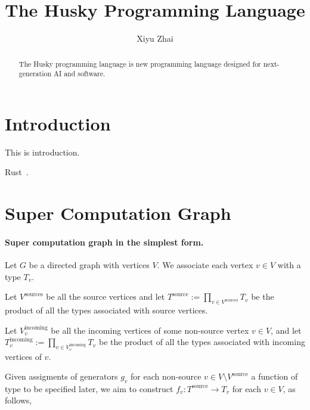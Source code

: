 \documentclass{article}
\title{The Husky Programming Language}
\date{}
\author{Xiyu Zhai}
\begin{document}

\maketitle

\begin{abstract}
	The Husky programming language is new programming language designed for next-generation AI and software.
\end{abstract}





\section{Introduction}
This is introduction.

Rust~\cite{bugden2022rust}.

\section{Super Computation Graph}

\paragraph{Super computation graph in the simplest form.} Let $G$ be a directed graph with vertices $V$. We associate each vertex $v\in V$ with a type $T_v$.

Let $V^{\text{sources}}$ be all the source vertices and let $T^{\text{source}}:=\prod_{v\in V^{\text{sources}}}T_v$ be the product of all the types associated with source vertices.

Let $V^{\text{incoming}}_v$ be all the incoming vertices of some non-source vertex $v\in V$, and let $T^{\text{incoming}}_v:=\prod_{v\in V^{\text{incoming}}_v}T_v$ be the product of all the types associated with incoming vertices of $v$.

Given assigments of generators $g_v$ for each non-source $v\in V\setminus V^{\text{source}}$ a function of type to be specified later, we aim to construct $f_v: T^{\text{source}} \rightarrow T_v$ for each $v\in V$, as follows,
\end{document}
